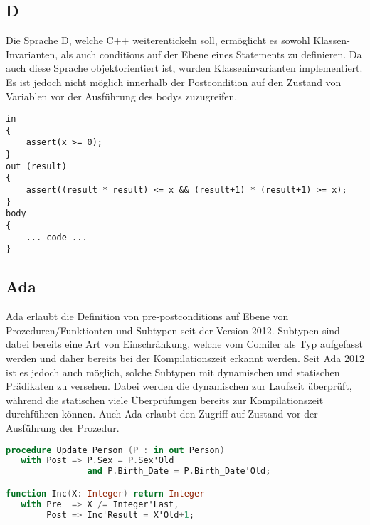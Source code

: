 \subsection{D}
Die Sprache D\cite{D:Main}, welche C++ weiterentickeln soll, ermöglicht es sowohl Klassen-Invarianten,
als auch conditions auf der Ebene eines Statements zu definieren. Da auch diese Sprache objektorientiert 
ist, wurden Klasseninvarianten implementiert. Es ist jedoch nicht möglich innerhalb der Postcondition 
auf den Zustand von Variablen vor der Ausführung des bodys zuzugreifen.\newline

\begin{lstlisting}[caption=Beispiel in D]
in 
{ 
    assert(x >= 0);
} 
out (result) 
{
    assert((result * result) <= x && (result+1) * (result+1) >= x);
} 
body
{
    ... code ...
}
\end{lstlisting}

\subsection{Ada}
Ada erlaubt die Definition von pre-postconditions auf Ebene von Prozeduren/Funktionten und Subtypen 
seit der Version 2012. Subtypen sind
dabei bereits eine Art von Einschränkung, welche vom Comiler als Typ aufgefasst werden und daher bereits
bei der Kompilationszeit erkannt werden. Seit Ada 2012 ist es jedoch auch möglich, solche Subtypen 
mit dynamischen und statischen Prädikaten zu versehen. Dabei werden die dynamischen zur Laufzeit 
überprüft, während die statischen viele Überprüfungen bereits zur Kompilationszeit
 durchführen können. Auch 
Ada erlaubt den Zugriff auf Zustand vor der Ausführung der Prozedur. \newline

\begin{lstlisting}[caption=Beispiel in Ada 2012,language=Ada]
procedure Update_Person (P : in out Person)
   with Post => P.Sex = P.Sex'Old 
                and P.Birth_Date = P.Birth_Date'Old;

function Inc(X: Integer) return Integer
   with Pre  => X /= Integer'Last,
        Post => Inc'Result = X'Old+1;
\end{lstlisting}
